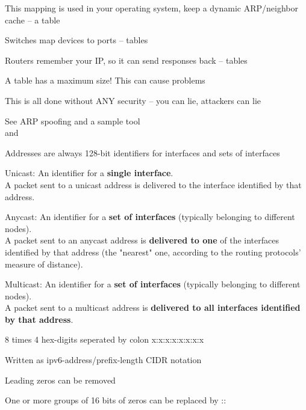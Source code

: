 \documentclass[Screen16to9,17pt]{foils}
\begin{document}

\begin{list2}
\item This mapping is used in your operating system, keep a dynamic ARP/neighbor cache -- a table
\item Switches map devices to ports -- tables
\item Routers remember your IP, so it can send responses back -- tables
\item A table has a maximum size! This can cause problems {\myalert}
\item This is all done without ANY security -- you can lie, attackers can lie
\item See ARP spoofing and a sample tool  \\
and 
\end{list2}



\begin{list1}
\item Addresses are always 128-bit identifiers for interfaces and sets of
   interfaces
\item Unicast:   An identifier for a {\bf single interface}.\\
A packet sent to a
               unicast address is delivered to the interface identified
               by that address.
\item Anycast:   An identifier for a {\bf set of interfaces} (typically
               belonging to different nodes).\\  A packet sent to an
               anycast address is {\bf delivered to one} of the interfaces
               identified by that address (the "nearest" one, according
               to the routing protocols' measure of distance).

\item Multicast: An identifier for a {\bf set of interfaces} (typically
               belonging to different nodes). \\ A packet sent to a
               multicast address is {\bf delivered to all interfaces
               identified by that address}.
\end{list1}



\begin{list1}
\item 8 times 4 hex-digits seperated by colon x:x:x:x:x:x:x:x
\item Written as ipv6-address/prefix-length CIDR notation
\item Leading zeros can be removed
\item One or more groups of 16 bits of zeros can be replaced by ::
\end{list1}
\end{document}
